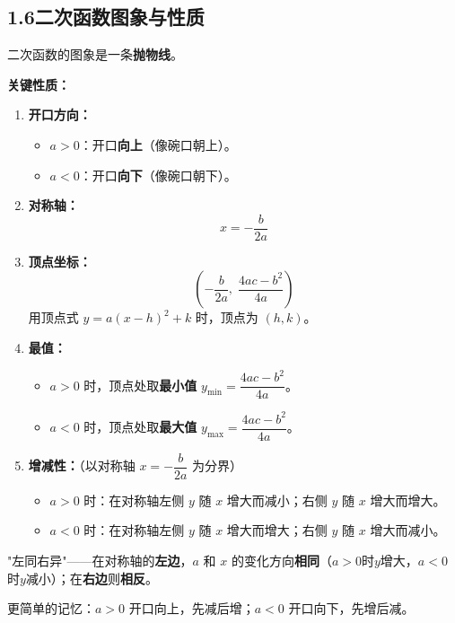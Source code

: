\documentclass[12pt, a4paper]{ctexart}
\begin{document}
\subsection*{1.6\quad 二次函数图象与性质}

\begin{knowledgebox}[二次函数 $y = ax^2 + bx + c$ 的图象与性质]
二次函数的图象是一条\textbf{抛物线}。

\textbf{关键性质：}
\begin{enumerate}[leftmargin=2em]
  \item \textbf{开口方向：}
  \begin{itemize}
    \item $a > 0$：开口\textbf{向上}（像碗口朝上）。
    \item $a < 0$：开口\textbf{向下}（像碗口朝下）。
  \end{itemize}
  \item \textbf{对称轴：}
  \[
  x = -\frac{b}{2a}
  \]
  \item \textbf{顶点坐标：}
  \[
  \left(-\frac{b}{2a},\; \frac{4ac - b^2}{4a}\right)
  \]
  用顶点式 $y = a(x-h)^2 + k$ 时，顶点为 $(h, k)$。
  \item \textbf{最值：}
  \begin{itemize}
    \item $a > 0$ 时，顶点处取\textbf{最小值} $y_{\min} = \dfrac{4ac - b^2}{4a}$。
    \item $a < 0$ 时，顶点处取\textbf{最大值} $y_{\max} = \dfrac{4ac - b^2}{4a}$。
  \end{itemize}
  \item \textbf{增减性：}（以对称轴 $x = -\dfrac{b}{2a}$ 为分界）
  \begin{itemize}
    \item $a > 0$ 时：在对称轴左侧 $y$ 随 $x$ 增大而减小；右侧 $y$ 随 $x$ 增大而增大。
    \item $a < 0$ 时：在对称轴左侧 $y$ 随 $x$ 增大而增大；右侧 $y$ 随 $x$ 增大而减小。
  \end{itemize}
\end{enumerate}
\end{knowledgebox}

\begin{warnbox}[记忆技巧]
"左同右异"——在对称轴的\textbf{左边}，$a$ 和 $x$ 的变化方向\textbf{相同}（$a>0$时$y$增大，$a<0$时$y$减小）；在\textbf{右边}则\textbf{相反}。\vspace{4pt}

更简单的记忆：$a > 0$ 开口向上，先减后增；$a < 0$ 开口向下，先增后减。
\end{warnbox}
\end{document}
